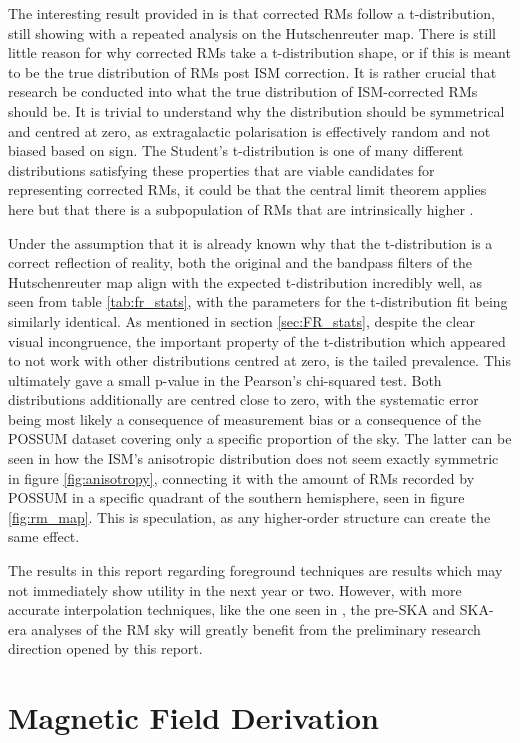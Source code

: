 The interesting result provided in \cite{ID73} is that corrected RMs follow a t-distribution, still showing with a repeated analysis on the Hutschenreuter map. There is still little reason for why corrected RMs take a t-distribution shape, or if this is meant to be the true distribution of RMs post ISM correction. It is rather crucial that research be conducted into what the true distribution of ISM-corrected RMs should be. It is trivial to understand why the distribution should be symmetrical and centred at zero, as extragalactic polarisation is effectively random and not biased based on sign. The Student's t-distribution is one of many different distributions satisfying these properties that are viable candidates for representing corrected RMs, it could be that the central limit theorem applies here but that there is a subpopulation of RMs that are intrinsically higher \citep{ID1}.


Under the assumption that it is already known why that the t-distribution is a correct reflection of reality, both the original and the bandpass filters of the Hutschenreuter map align with the expected t-distribution incredibly well, as seen from table \ref{tab:fr_stats}, with the parameters for the t-distribution fit being similarly identical. As mentioned in section \ref{sec:FR_stats}, despite the clear visual incongruence, the important property of the t-distribution which appeared to not work with other distributions centred at zero, is the tailed prevalence. This ultimately gave a small p-value in the Pearson's chi-squared test. Both distributions additionally are centred close to zero, with the systematic error being most likely a consequence of measurement bias or a consequence of the POSSUM dataset covering only a specific proportion of the sky. The latter can be seen in how the ISM's anisotropic distribution does not seem exactly symmetric in figure \ref{fig:anisotropy}, connecting it with the amount of RMs recorded by POSSUM in a specific quadrant of the southern hemisphere, seen in figure \ref{fig:rm_map}. This is speculation, as any higher-order structure can create the same effect.


The results in this report regarding foreground techniques are results which may not immediately show utility in the next year or two. However, with more accurate interpolation techniques, like the one seen in \cite{ID58}, the pre-SKA and SKA-era analyses of the RM sky will greatly benefit from the preliminary research direction opened by this report.

\section{Magnetic Field Derivation}
\label{sec:mag_disc}

